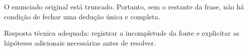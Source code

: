 O enunciado original está truncado. Portanto, sem o restante da frase, não há condição de fechar uma dedução única e completa.

Resposta técnica adequada: registrar a incompletude da fonte e explicitar as hipóteses adicionais necessárias antes de resolver.

